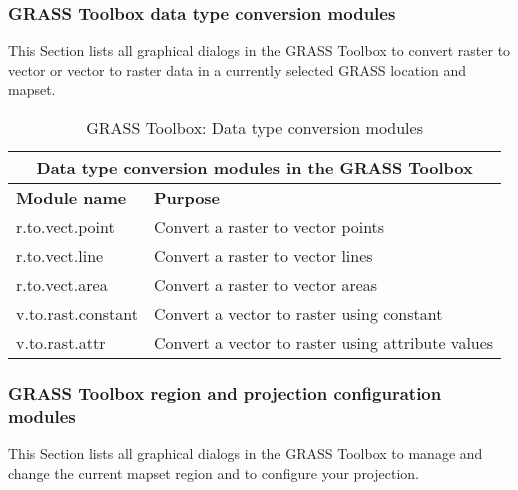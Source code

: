 \subsubsection{GRASS Toolbox data type conversion modules}

This Section lists all graphical dialogs in the GRASS Toolbox to convert
raster to vector or vector to raster data in a currently selected GRASS location 
and mapset.

\begin{table}[ht]
\centering
\caption{GRASS Toolbox: Data type conversion modules}\medskip
 \begin{tabular}{|p{4cm}|p{12cm}|}
  \hline \multicolumn{2}{|c|}{\textbf{Data type conversion modules in the GRASS
  Toolbox}} \\
  \hline \textbf{Module name} & \textbf{Purpose} \\
  \hline r.to.vect.point & Convert a raster to vector points \\
  \hline r.to.vect.line & Convert a raster to vector lines \\
  \hline r.to.vect.area & Convert a raster to vector areas \\
  \hline v.to.rast.constant & Convert a vector to raster using constant \\
  \hline v.to.rast.attr & Convert a vector to raster using attribute values \\
\hline
\end{tabular}
\end{table}

\subsubsection{GRASS Toolbox region and projection configuration modules}

This Section lists all graphical dialogs in the GRASS Toolbox to manage and
change the current mapset region and to configure your projection.

